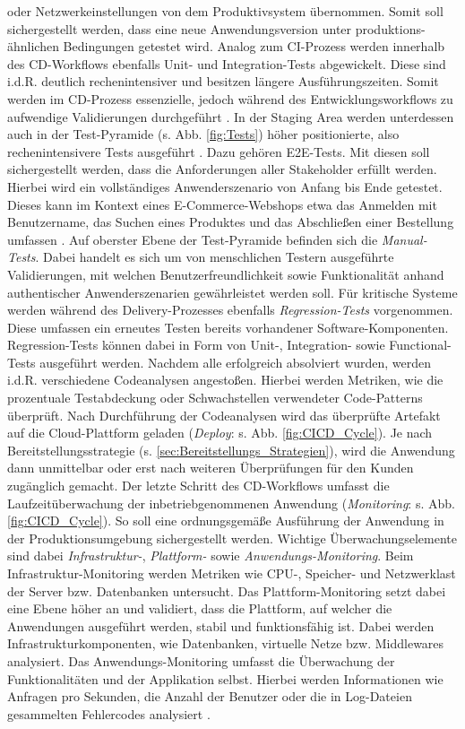 oder Netzwerkeinstellungen von dem Produktivsystem übernommen. Somit soll sichergestellt werden, dass eine neue Anwendungsversion unter produktions-ähnlichen Bedingungen getestet wird. Analog zum CI-Prozess werden innerhalb des CD-Workflows ebenfalls Unit- und Integration-Tests abgewickelt. Diese sind i.d.R. deutlich rechenintensiver und besitzen längere Ausführungszeiten. Somit werden im CD-Prozess essenzielle, jedoch während des Entwicklungsworkflows zu aufwendige Validierungen durchgeführt \cite[20]{Halstenberg.2020}. In der Staging Area werden unterdessen auch in der Test-Pyramide (s. Abb. \ref*{fig:Tests}) höher positionierte, also rechenintensivere Tests ausgeführt \cite[Kap. 2]{Hambling.2015}. Dazu gehören {\ac{E2E-Tests}}. Mit diesen soll sichergestellt werden, dass die Anforderungen aller Stakeholder erfüllt werden. Hierbei wird ein vollständiges Anwenderszenario von Anfang bis Ende getestet. Dieses kann im Kontext eines E-Commerce-Webshops etwa das Anmelden mit Benutzername, das Suchen eines Produktes und das Abschließen einer Bestellung umfassen \cite{Bose.20230220}. Auf oberster Ebene der Test-Pyramide befinden sich die \textit{Manual-Tests}. Dabei handelt es sich um von menschlichen Testern ausgeführte Validierungen, mit welchen Benutzerfreundlichkeit sowie Funktionalität anhand authentischer Anwenderszenarien gewährleistet werden soll. Für kritische Systeme werden während des Delivery-Prozesses ebenfalls \textit{Regression-Tests} vorgenommen. Diese umfassen ein erneutes Testen bereits vorhandener Software-Komponenten. Regression-Tests können dabei in Form von Unit-, Integration- sowie Functional-Tests ausgeführt werden. Nachdem alle erfolgreich absolviert wurden, werden i.d.R. verschiedene Codeanalysen angestoßen. Hierbei werden Metriken, wie die prozentuale Testabdeckung oder Schwachstellen verwendeter Code-Patterns überprüft. Nach Durchführung der Codeanalysen wird das überprüfte Artefakt auf die Cloud-Plattform geladen (\textit{Deploy}: s. Abb. \ref*{fig:CICD_Cycle}). Je nach Bereitstellungsstrategie (s. \ref*{sec:Bereitstellungs_Strategien}), wird die Anwendung dann unmittelbar oder erst nach weiteren Überprüfungen für den Kunden zugänglich gemacht. Der letzte Schritt des CD-Workflows umfasst die Laufzeitüberwachung der inbetriebgenommenen Anwendung (\textit{Monitoring}: s. Abb. \ref*{fig:CICD_Cycle}). So soll eine ordnungsgemäße Ausführung der Anwendung in der Produktionsumgebung sichergestellt werden. Wichtige Überwachungselemente sind dabei \textit{Infrastruktur-}, \textit{Plattform-} sowie \textit{Anwendungs-Monitoring}. Beim Infrastruktur-Monitoring werden Metriken wie CPU-, Speicher- und Netzwerklast der Server bzw. Datenbanken untersucht. Das Plattform-Monitoring setzt dabei eine Ebene höher an und validiert, dass die Plattform, auf welcher die Anwendungen ausgeführt werden, stabil und funktionsfähig ist. Dabei werden Infrastrukturkomponenten, wie Datenbanken, virtuelle Netze bzw. Middlewares analysiert. Das Anwendungs-Monitoring umfasst die Überwachung der Funktionalitäten und der Applikation selbst. Hierbei werden Informationen wie Anfragen pro Sekunden, die Anzahl der Benutzer oder die in Log-Dateien gesammelten Fehlercodes analysiert \cite[21]{Halstenberg.2020}.\\ 
